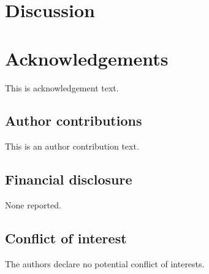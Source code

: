 \documentclass[AMA,STIX1COL]{WileyNJD-v2}
\begin{document}
\section{Discussion}\label{sec:discussion}




\section*{Acknowledgements}
This is acknowledgement text.

\subsection*{Author contributions}

This is an author contribution text.

\subsection*{Financial disclosure}

None reported.

\subsection*{Conflict of interest}

The authors declare no potential conflict of interests.









\end{document}
